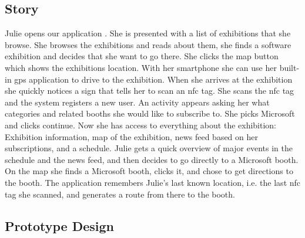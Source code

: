 \subsection*{Story}
Julie opens our application . She is presented with a list of exhibitions that she browse. She browses the exhibitions and reads about them, she finds a software exhibition and decides that she want to go there. She clicks the map button which shows the exhibitions location. With her smartphone she can use her built-in \ac{gps} application to drive to the exhibition. When she arrives at the exhibition she quickly notices a sign that tells her to scan an \acs{nfc} tag. She scans the \acs{nfc} tag and the system registers a new user. An activity appears asking her what categories and related booths she would like to subscribe to. She picks Microsoft and clicks continue. Now she has access to everything about the exhibition: Exhibition information, map of the exhibition, news feed based on her subscriptions, and a schedule. Julie gets a quick overview of major events in the schedule and the news feed, and then decides to go directly to a Microsoft booth. On the map she finds a Microsoft booth, clicks it, and chose to get directions to the booth. The application remembers Julie's last known location, i.e. the last \acs{nfc} tag she scanned, and generates a route from there to the booth.

\subsection*{Prototype Design}

